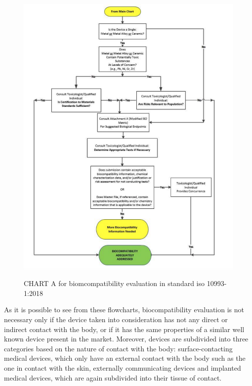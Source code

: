 \documentclass{Configuration_Files/PoliMi3i_thesis}
\begin{document}
\begin{figure}[H]

	\includegraphics[scale=0.25]{figure2_fda.png}
	\centering
    \label{fda_2}
    \caption{CHART A for biomcompatibility evaluation in standard iso 10993-1:2018 \cite{healthUseInternationalStandard2023}}
\end{figure}





As it is possible to see from these flowcharts, biocompatibility evaluation is not necessary only if the device taken into consideration has not any direct or indirect contact with the body, or if it has the same properties of a similar well known device present in the market.
Moreover, devices are subdivided into three categories based on the nature of contact with the body: surface-contacting medical devices, which only have an external contact with the body such as the one in contact with the skin, externally communicating devices and implanted medical devices, which are again subdivided into their tissue of contact.
\end{document}
